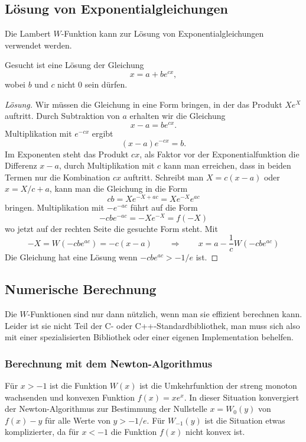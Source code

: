 %
%
\subsection{Lösung von Exponentialgleichungen
\label{buch:subsection:loesung-von-exponentialgleichungen}}
Die Lambert $W$-Funktion kann zur Lösung von Exponentialgleichungen
verwendet werden.

\begin{aufgabe}
Gesucht ist eine Lösung der Gleichung
\[
x=a+be^{cx},
\]
wobei $b$ und $c$ nicht $0$ sein dürfen.
\end{aufgabe}

\begin{proof}[Lösung]
Wir müssen die Gleichung in eine Form bringen, in der das Produkt 
$Xe^X$ auftritt.
Durch Subtraktion von $a$ erhalten wir die Gleichung 
\[
x-a = be^{cx}.
\]
Multiplikation mit $e^{-cx}$ ergibt
\[
(x-a)e^{-cx}=b.
\]
Im Exponenten steht das Produkt $cx$, als Faktor vor der Exponentialfunktion
die Differenz $x-a$, durch Multiplikation mit $c$ kann man erreichen,
dass in beiden Termen nur die Kombination $cx$ auftritt.
Schreibt man $X=c(x-a)$ oder $x=X/c+a$, kann man die Gleichung in die Form
\[
cb
=
Xe^{-X+ac}
=
Xe^{-X}e^{ac}
\]
bringen.
Multiplikation mit $-e^{-ac}$ führt auf die Form
\[
-cbe^{-ac}
=
-Xe^{-X}
=
f(-X)
\]
wo jetzt auf der rechten Seite die gesuchte Form steht.
Mit 
\[
-X
=
W(-cbe^{ac})
=
-c(x-a)
\qquad\Rightarrow\qquad
x
=
a
-
\frac{1}{c}
W(-cbe^{ac})
\]
Die Gleichung hat eine Lösung wenn $-cbe^{ac} > -1/e$ ist.
\end{proof}

\subsection{Numerische Berechnung
\label{buch:subsection:lambertberechnung}}
Die $W$-Funktionen sind nur dann nützlich, wenn man sie effizient
berechnen kann.
Leider ist sie nicht Teil der C- oder C++-Standardbibliothek,
man muss sich also mit einer spezialisierten Bibliothek oder einer
eigenen Implementation behelfen.

\subsubsection{Berechnung mit dem Newton-Algorithmus}
Für $x>-1$ ist die Funktion $W(x)$ ist die Umkehrfunktion der
streng monoton wachsenden und konvexen Funktion $f(x)=xe^x$.
In dieser Situation konvergiert der Newton-Algorithmus zur Bestimmung
der Nullstelle $x=W_0(y)$ von $f(x)-y$ für alle Werte von $y>-1/e$.
Für $W_{-1}(y)$ ist die Situation etwas komplizierter, da für
$x<-1$ die Funktion $f(x)$ nicht konvex ist.

